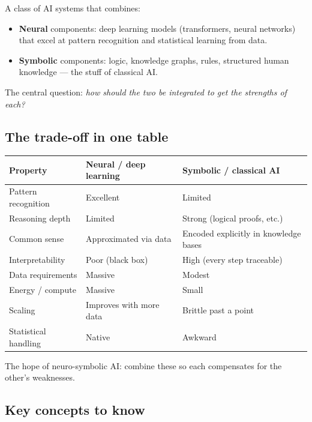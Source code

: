 \documentclass[11pt, a4paper]{article}
\newcommand{\thead}[1]{\textbf{#1}}
\begin{document}
\begin{defbox}
A class of AI systems that combines:
\begin{itemize}[itemsep=0pt, topsep=0pt]
  \item \textbf{Neural} components: deep learning models (transformers, neural networks) that excel at pattern recognition and statistical learning from data.
  \item \textbf{Symbolic} components: logic, knowledge graphs, rules, structured human knowledge — the stuff of classical AI.
\end{itemize}
The central question: \emph{how should the two be integrated to get the strengths of each?}
\end{defbox}

\subsection{The trade-off in one table}

\begin{center}
\renewcommand{\arraystretch}{1.25}
\begin{tabular}{@{}p{4cm}p{5cm}p{5.5cm}@{}}
\toprule
\thead{Property} & \thead{Neural / deep learning} & \thead{Symbolic / classical AI} \\
\midrule
Pattern recognition  & Excellent                  & Limited \\
Reasoning depth      & Limited                    & Strong (logical proofs, etc.) \\
Common sense         & Approximated via data      & Encoded explicitly in knowledge bases \\
Interpretability     & Poor (black box)           & High (every step traceable) \\
Data requirements    & Massive                    & Modest \\
Energy / compute     & Massive                    & Small \\
Scaling              & Improves with more data    & Brittle past a point \\
Statistical handling & Native                     & Awkward \\
\bottomrule
\end{tabular}
\end{center}

The hope of neuro-symbolic AI: combine these so each compensates for the other's weaknesses.

\subsection{Key concepts to know}
\end{document}
